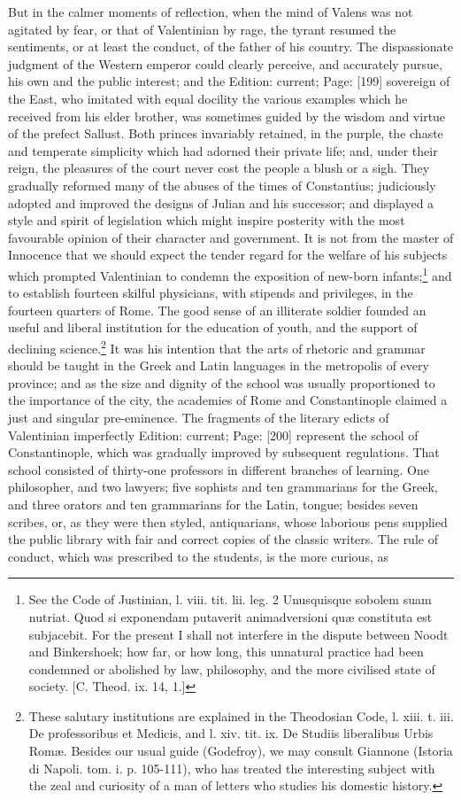 But in the calmer moments of reflection, when the mind of Valens was not agitated by fear, or that of Valentinian by rage, the tyrant resumed the sentiments, or at least the conduct, of the father of his country. The dispassionate judgment of the Western emperor could clearly perceive, and accurately pursue, his own and the public interest; and the Edition: current; Page: [199] sovereign of the East, who imitated with equal docility the various examples which he received from his elder brother, was sometimes guided by the wisdom and virtue of the prefect Sallust. Both princes invariably retained, in the purple, the chaste and temperate simplicity which had adorned their private life; and, under their reign, the pleasures of the court never cost the people a blush or a sigh. They gradually reformed many of the abuses of the times of Constantius; judiciously adopted and improved the designs of Julian and his successor; and displayed a style and spirit of legislation which might inspire posterity with the most favourable opinion of their character and government. It is not from the master of Innocence that we should expect the tender regard for the welfare of his subjects which prompted Valentinian to condemn the exposition of new-born infants;\footnote{See the Code of Justinian, l. viii. tit. lii. leg. 2 Unusquisque sobolem suam nutriat. Quod si exponendam putaverit animadversioni quæ constituta est subjacebit. For the present I shall not interfere in the dispute between Noodt and Binkershoek; how far, or how long, this unnatural practice had been condemned or abolished by law, philosophy, and the more civilised state of society. [C. Theod. ix. 14, 1.]} and to establish fourteen skilful physicians, with stipends and privileges, in the fourteen quarters of Rome. The good sense of an illiterate soldier founded an useful and liberal institution for the education of youth, and the support of declining science.\footnote{These salutary institutions are explained in the Theodosian Code, l. xiii. t. iii. De professoribus et Medicis, and l. xiv. tit. ix. De Studiis liberalibus Urbis Romæ. Besides our usual guide (Godefroy), we may consult Giannone (Istoria di Napoli. tom. i. p. 105-111), who has treated the interesting subject with the zeal and curiosity of a man of letters who studies his domestic history.} It was his intention that the arts of rhetoric and grammar should be taught in the Greek and Latin languages in the metropolis of every province; and as the size and dignity of the school was usually proportioned to the importance of the city, the academies of Rome and Constantinople claimed a just and singular pre-eminence. The fragments of the literary edicts of Valentinian imperfectly Edition: current; Page: [200] represent the school of Constantinople, which was gradually improved by subsequent regulations. That school consisted of thirty-one professors in different branches of learning. One philosopher, and two lawyers; five sophists and ten grammarians for the Greek, and three orators and ten grammarians for the Latin, tongue; besides seven scribes, or, as they were then styled, antiquarians, whose laborious pens supplied the public library with fair and correct copies of the classic writers. The rule of conduct, which was prescribed to the students, is the more curious, as 